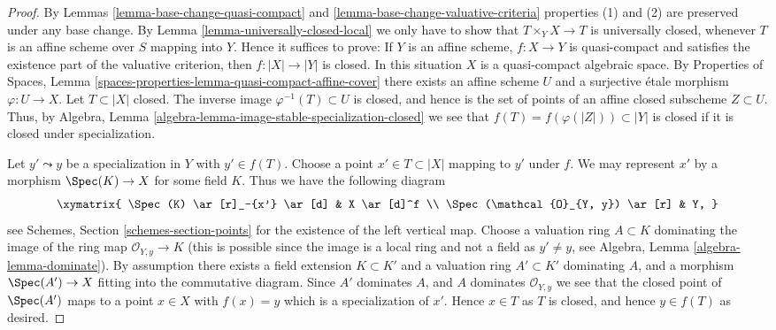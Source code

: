 \begin{proof}
By Lemmas \ref{lemma-base-change-quasi-compact}
and \ref{lemma-base-change-valuative-criteria}
properties (1) and (2) are preserved under
any base change. By Lemma \ref{lemma-universally-closed-local}
we only have to show that $T \times_Y X \to T$ is universally closed,
whenever $T$ is an affine scheme over $S$ mapping into $Y$. Hence it
suffices to prove: If $Y$ is an affine scheme, $f : X \to Y$ is quasi-compact
and satisfies the existence part of the valuative criterion, then
$f : |X| \to |Y|$ is closed. In this situation $X$ is a quasi-compact
algebraic space. By
Properties of Spaces,
Lemma \ref{spaces-properties-lemma-quasi-compact-affine-cover}
there exists an affine scheme $U$ and a surjective \'etale morphism
$\varphi : U \to X$. Let $T \subset |X|$ closed. The inverse image
$\varphi^{-1}(T) \subset U$ is closed, and hence is the set of points
of an affine closed subscheme $Z \subset U$. Thus, by
Algebra, Lemma \ref{algebra-lemma-image-stable-specialization-closed}
we see that $f(T) = f(\varphi(|Z|)) \subset |Y|$ is closed if it is
closed under specialization.

\medskip\noindent
Let $y' \leadsto y$ be a specialization in $Y$ with $y' \in f(T)$.
Choose a point $x' \in T \subset |X|$ mapping to $y'$ under $f$.
We may represent $x'$ by a morphism $\Spec(K) \to X$
for some field $K$. Thus we have the following diagram
$$
\xymatrix{
\Spec(K) \ar[r]_-{x'} \ar[d] & X \ar[d]^f \\
\Spec(\mathcal{O}_{Y, y}) \ar[r] & Y,
}
$$
see
Schemes, Section \ref{schemes-section-points}
for the existence of the left vertical map.
Choose a valuation ring $A \subset K$ dominating the image of
the ring map $\mathcal{O}_{Y, y} \to K$ (this is possible since
the image is a local ring and not a field as $y' \not = y$, see
Algebra, Lemma \ref{algebra-lemma-dominate}).
By assumption there exists a field extension $K \subset K'$ and a
valuation ring $A' \subset K'$ dominating $A$, and a morphism
$\Spec(A') \to X$ fitting into the commutative diagram.
Since $A'$ dominates $A$, and $A$ dominates $\mathcal{O}_{Y, y}$
we see that the closed point of $\Spec(A')$ maps to
a point $x \in X$ with $f(x) = y$ which is a specialization of $x'$.
Hence $x \in T$ as $T$ is closed, and hence $y \in f(T)$ as desired.
\end{proof}

